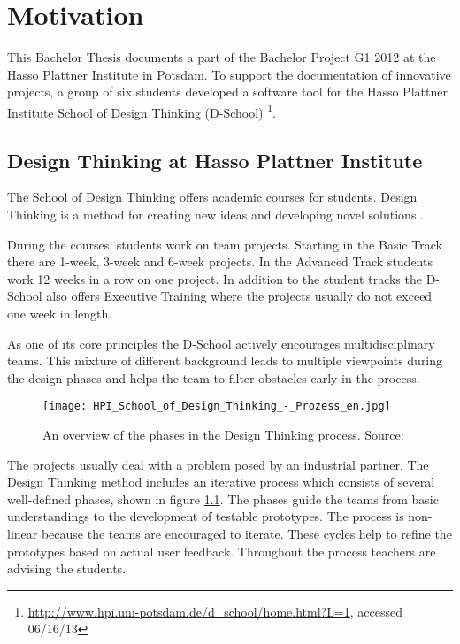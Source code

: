 \chapter{Motivation}

This Bachelor Thesis documents a part of the Bachelor Project G1 2012 at the Hasso Plattner Institute in Potsdam. To support the documentation of innovative projects, a group of six students developed a software tool for the Hasso Plattner Institute School of Design Thinking (D-School) \footnote{\url{http://www.hpi.uni-potsdam.de/d_school/home.html?L=1}, accessed 06/16/13}. 

\section{Design Thinking at Hasso Plattner Institute}
The School of Design Thinking offers academic courses for students. Design Thinking is a method for creating new ideas and developing novel solutions \cite{Plattner_2009}. 

During the courses, students work on team projects. Starting in the Basic Track there are 1-week, 3-week and 6-week projects. In the Advanced Track students work 12 weeks in a row on one project. In addition to the student tracks the D-School also offers Executive Training where the projects usually do not exceed one week in length. 

As one of its core principles the D-School actively encourages multidisciplinary teams. This mixture of different background leads to multiple viewpoints during the design phases and helps the team to filter obstacles early in the process. 

\begin{figure}[!h]
\texttt{[image: HPI\_School\_of\_Design\_Thinking\_-\_Prozess\_en.jpg]}
\caption{An overview of the phases in the Design Thinking process. Source: \cite{Plattner_2009}}
\label{fig:DT_phases}
\end{figure}

\pagebreak

The projects usually deal with a problem posed by an industrial partner. The Design Thinking method includes an iterative process which consists of several well-defined phases, shown in figure \ref{fig:DT_phases}. The phases guide the teams from basic understandings to the development of testable prototypes. The process is non-linear because the teams are encouraged to iterate. These cycles help to refine the prototypes based on actual user feedback. Throughout the process teachers are advising the students.

